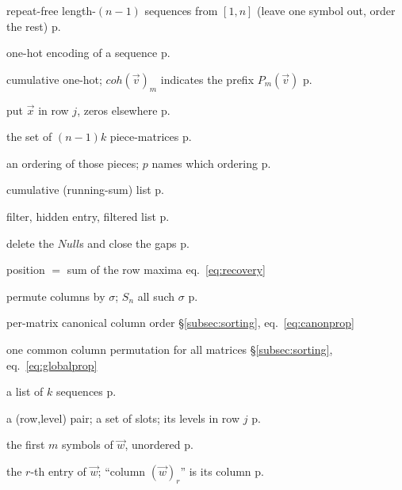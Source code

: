\documentclass{article}
\begin{document}
\renewcommand{\arraystretch}{1.25}
\begin{description}\setlength{\itemsep}{1pt}
\item[$s(n)$] repeat-free length-$(n{-}1)$ sequences from $[1,n]$ (leave one symbol out, order the rest) \dotfill p.~\pageref{def:sn}
\item[$oh(\vec v)$] one-hot encoding of a sequence \dotfill p.~\pageref{def:oh}
\item[$coh(\vec v)$] cumulative one-hot; $coh(\vec v)_m$ indicates the prefix $P_m(\vec v)$ \dotfill p.~\pageref{def:coh}
\item[$mat(\vec x,j)$] put $\vec x$ in row $j$, zeros elsewhere \dotfill p.~\pageref{def:mat}
\item[$U(\cdots)$] the set of $(n{-}1)k$ piece-matrices \dotfill p.~\pageref{def:U}
\item[$\vec U(\cdots;p)$, $p$] an ordering of those pieces; $p$ names which ordering \dotfill p.~\pageref{def:ordering}
\item[$C\vec U$] cumulative (running-sum) list \dotfill p.~\pageref{def:CU}
\item[$\vec f$, $Null$, $FC\vec U$] filter, hidden entry, filtered list \dotfill p.~\pageref{def:FCU}
\item[$clean$] delete the $Null$s and close the gaps \dotfill p.~\pageref{def:clean}
\item[position recovery] position $=$ sum of the row maxima \dotfill eq.~\eqref{eq:recovery}
\item[$colPerm(m,\sigma)$, $S_n$] permute columns by $\sigma$; $S_n$ all such $\sigma$ \dotfill p.~\pageref{def:colperm}
\item[$canon$, $localSort$] per-matrix canonical column order \dotfill \S\ref{subsec:sorting}, eq.~\eqref{eq:canonprop}
\item[$globalSort$] one common column permutation for all matrices \dotfill \S\ref{subsec:sorting}, eq.~\eqref{eq:globalprop}
\item[$\vec v,\vec u$ (configuration)] a list of $k$ sequences \dotfill p.~\pageref{def:config}
\item[slot $(j,m)$, $Q$, $A_j(Q)$] a (row,level) pair; a set of slots; its levels in row $j$ \dotfill p.~\pageref{def:slot}
\item[$P_m(\vec w)$ (prefix set)] the first $m$ symbols of $\vec w$, unordered \dotfill p.~\pageref{def:prefix}
\item[$(\vec w)_r$] the $r$-th entry of $\vec w$; ``column $(\vec w)_r$'' is its column \dotfill p.~\pageref{def:wr}

\end{description}
\end{document}
